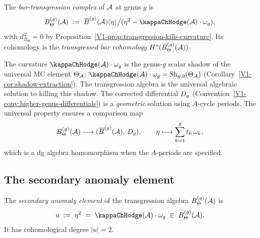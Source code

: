 \begin{definition}
The \emph{bar-transgression complex} of $\mathcal{A}$ at genus $g$ is
\begin{equation}%
B_\Theta^{(g)}(\cA)
\;:=\;
\barB^{(g)}(\cA)\langle \eta \rangle
\big/ (\eta^2 - \kappaChHodge(\cA) \cdot \omega_g),
\end{equation}
with $d_{B_\Theta}^{\,2} = 0$ by
Proposition~\ref{V1-prop:transgression-kills-curvature}.
Its cohomology is the \emph{transgressed bar cohomology}
$H^*(B_\Theta^{(g)}(\mathcal{A}))$.
\end{definition}

\begin{remark}
The curvature $\kappaChHodge(\cA) \cdot \omega_g$ is the genus-$g$ scalar
shadow of the universal MC element $\Theta_{\mathcal{A}}$:
$\kappaChHodge(\cA) \cdot \omega_g = \mathrm{Sh}_{g,0}(\Theta_\cA)$
(Corollary~\ref*{V1-cor:shadow-extraction}).
The transgression algebra is the universal algebraic solution to
killing this shadow. The corrected differential $D_{g}$
(Convention~\ref{V1-conv:higher-genus-differentials}) is a
\emph{geometric} solution using $A$-cycle periods. The universal
property ensures a comparison map
\[
B_\Theta^{(g)}(\mathcal{A}) \longrightarrow
(\overline{B}^{(g)}(\mathcal{A}),\, D_{g}),
\qquad
\eta \longmapsto
\sum_{k=1}^g t_k\, \omega_k,
\]
which is a dg algebra homomorphism when the $A$-periods are specified.
\end{remark}

%
%

\subsection{The secondary anomaly element}

\begin{definition}
The \emph{secondary anomaly element} of the transgression algebra
$B_\Theta^{(g)}(\mathcal{A})$ is
\begin{equation}%
u \;:=\; \eta^2 \;=\; \kappaChHodge(\cA) \cdot \omega_g
\;\in\; B_\Theta^{(g)}(\cA).
\end{equation}
It has cohomological degree $|u| = 2$.
\end{definition}

